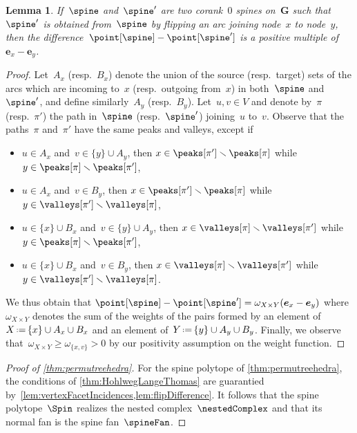 \documentclass{amsart}
\newtheorem{lemma}[theorem]{Lemma}
\theoremstyle{definition}
\renewcommand{\b}[1]{{\boldsymbol{#1}}} %
\newcommand{\ssm}{\smallsetminus} %
\newcommand{\eqdef}{\mbox{\,\raisebox{0.2ex}{\scriptsize\ensuremath{\mathrm:}}\ensuremath{=}\,}} %
\newcommand{\vertexSet}{V}
\newcommand{\weight}{\omega} %
\begin{document}
\begin{lemma}
  \label{lem:flipDifference}
  If~$\spine$ and~$\spine'$ are two corank~$0$ spines on~$\b{G}$ such that~$\spine'$ is obtained from~$\spine$ by flipping an arc joining node~$x$ to node~$y$, then the difference~$\point[\spine] - \point[\spine']$ is a positive multiple of~$\b{e}_x - \b{e}_y$.
\end{lemma}

\begin{proof}
  Let~$A_x$ (resp.~$B_x$) denote the union of the source (resp.~target) sets of the arcs which are incoming to~$x$ (resp.~outgoing from~$x$) in both~$\spine$ and~$\spine'$, and define similarly~$A_y$ (resp.~$B_y$).
  Let~$u,v \in \vertexSet$ and denote by~$\pi$ (resp.~$\pi'$) the path in~$\spine$ (resp.~$\spine'$) joining~$u$ to~$v$.
  Observe that the paths~$\pi$ and~$\pi'$ have the same peaks and valleys, except if
  \begin{itemize}
    \item $u \in A_x$ and~$v \in \{y\} \cup A_y$, then $x \in \peaks[\pi'] \ssm \peaks[\pi]$ while~$y \in \peaks[\pi] \ssm \peaks[\pi']$,
    \item $u \in A_x$ and~$v \in B_y$, then $x \in \peaks[\pi'] \ssm \peaks[\pi]$ while~$y \in \valleys[\pi'] \ssm \valleys[\pi]$,
    \item $u \in \{x\} \cup B_x$ and~$v \in \{y\} \cup A_y$, then $x \in \valleys[\pi] \ssm \valleys[\pi']$ while~$y \in \peaks[\pi] \ssm \peaks[\pi']$,
    \item $u \in \{x\} \cup B_x$ and~$v \in B_y$, then $x \in \valleys[\pi] \ssm \valleys[\pi']$ while~$y \in \valleys[\pi'] \ssm \valleys[\pi]$.
  \end{itemize}
  We thus obtain that
  \(
    \point[\spine] - \point[\spine'] = \weight_{X \times Y} (\b{e}_x - \b{e}_y)
  \)
  where~$\weight_{X \times Y}$ denotes the sum of the weights of the pairs formed by an element of~$X \eqdef \{x\} \cup A_x \cup B_x$ and an element of~$Y \eqdef \{y\} \cup A_y \cup B_y$.
  Finally, we observe that~$\weight_{X \times Y} \ge \weight_{\{x,v\}} > 0$ by our positivity assumption on the weight function.
\end{proof}

\begin{proof}[Proof of \cref{thm:permutreehedra}]
  For the spine polytope of \cref{thm:permutreehedra}, the conditions of \cref{thm:HohlwegLangeThomas} are guarantied by~\cref{lem:vertexFacetIncidences,lem:flipDifference}.
  It follows that the spine polytope~$\Spin$ realizes the nested complex~$\nestedComplex$ and that its normal fan is the spine fan~$\spineFan$.
\end{proof}
\end{document}
